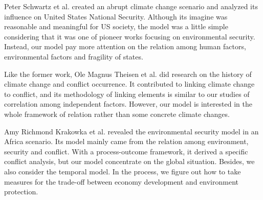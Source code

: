 Peter Schwartz et al. \cite{schwartz2003abrupt} created an abrupt climate change scenario and analyzed its influence on United States National Security. Although its imagine was reasonable and meaningful for US society, the model was a little simple considering that it was one of pioneer works focusing on environmental security. Instead, our model pay more attention on the relation among human factors, environmental factors and fragility of states.

Like the former work, Ole Magnus Theisen et al. \cite{theisen2013climate} did research on the history of climate change and conflict occurrence. It contributed to linking climate change to conflict, and its methodology of linking elements is similar to our studies of correlation among independent factors. However, our model is interested in the whole framework of relation rather than some concrete climate changes.

Amy Richmond Krakowka et al. \cite{krakowka2012modeling} revealed the environmental security model in an Africa scenario. Its model mainly came from the relation among environment, security and conflict. With a process-outcome framework, it derived a specific conflict analysis, but our model concentrate on the global situation. Besides, we also consider the temporal model. In the process, we figure out how to take measures for the trade-off between economy development and environment protection.
